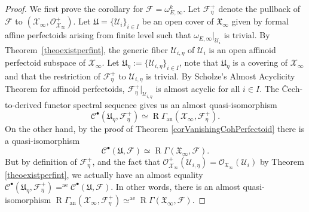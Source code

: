 \documentclass[11pt]{article}
\newcommand{\sbullet}{{\scriptscriptstyle\bullet}}
\newcommand{\rae}{\mathrm{ae}}
\newcommand{\an}{\mathrm{an}}
\numberwithin{equation}{section}
\theoremstyle{definition}
\newcommand{\n}[1]{\mathcal{#1}}
\newcommand{\f}[1]{\mathfrak{#1}}
\newcommand{\s}[1]{\mathscr{#1}}
\DeclareMathOperator{\R}{R}
\begin{document}
\begin{proof}
We first prove the corollary for $\n{F}=\omega_{E,\infty}^k$. Let $\n{F}^+_{\eta}$ denote the pullback of~$\n{F}$ to $(\n{X}_{\infty}, \s{O}^+_{\n{X}_{\infty}})$. Let $\f{U}=\{\n{U}_i\}_{i\in I}$ be an open cover of $\f{X}_{\infty}$ given by formal affine perfectoids arising from finite level such that $\omega_{E,\infty}|_{\n{U}_i}$ is trivial. By Theorem~\ref{theoexistperfint}, the generic fiber $ \n{U}_{i,\eta} $ of $\n{U}_i$ is an open affinoid perfectoid subspace of $\n{X}_{\infty}$. Let $\f{U}_{\eta}:= \{ \n{U}_{i,\eta}\}_{i\in I}$, note that $\f{U}_{\eta}$ is a covering of $\n{X}_{\infty}$ and that the restriction of $\n{F}^+_{\eta}$ to $\n{U}_{i,\eta}$ is trivial.
By Scholze's Almost Acyclicity Theorem for affinoid perfectoids, $\n{F}^+_{\eta}|_{\n{U}_{i,\eta}}$ is almost acyclic for all $i\in I$. The \v{C}ech-to-derived functor spectral sequence gives us an almost quasi-isomorphism
\[
\s{C}^{\sbullet}(\f{U}_{\eta}, \n{F}^+_{\eta}) \simeq \R\Gamma_{\an}(\n{X}_{\infty}, \n{F}^+_{\eta}).
\]
On the other hand, by the proof of Theorem \ref{corVanishingCohPerfectoid} there is a quasi-isomorphism
\[
\s{C}^{\sbullet}(\f{U}, \n{F})\simeq \R\Gamma(\f{X}_{\infty}, \n{F}).
\]
But by definition of $\n{F}^+_{\eta}$, and the fact that $\s{O}^+_{\n{X}_{\infty}}(\n{U}_{i,\eta})= \s{O}_{\f{X}_{\infty}}(\n{U}_i)$ by Theorem \ref{theoexistperfint}, we actually have an almost equality $\s{C}^{\sbullet}(\f{U}_{\eta}, \n{F}^+_{\eta}) =^{\rae} \s{C}^{\sbullet}(\f{U}, \n{F})$. In other words, there is an almost quasi-isomorphism $ \R\Gamma_{\an}(\n{X}_{\infty}, \n{F}^+_{\eta}) \simeq^{\rae} \R\Gamma(\f{X}_{\infty}, \n{F})$.


\end{proof}
\end{document}
